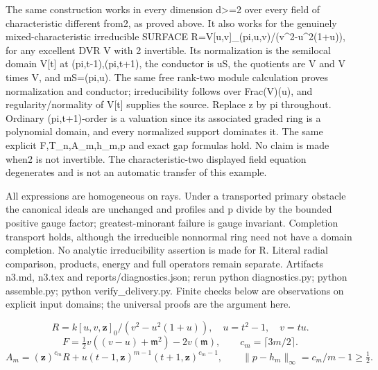 The same construction works in every dimension d\textgreater{}=2 over every field of characteristic different from2, as proved above. It also works for the genuinely mixed-characteristic irreducible SURFACE R=V[u,v]\_(pi,u,v)/(v\textasciicircum{}2-u\textasciicircum{}2(1+u)), for any excellent DVR V with 2 invertible. Its normalization is the semilocal domain V[t] at (pi,t-1),(pi,t+1), the conductor is uS, the quotients are V and V times V, and mS=(pi,u). The same free rank-two module calculation proves normalization and conductor; irreducibility follows over Frac(V)(u), and regularity/normality of V[t] supplies the source. Replace z by pi throughout. Ordinary (pi,t+1)-order is a valuation since its associated graded ring is a polynomial domain, and every normalized support dominates it. The same explicit F,T\_n,A\_m,h\_m,p and exact gap formulas hold. No claim is made when2 is not invertible. The characteristic-two displayed field equation degenerates and is not an automatic transfer of this example.

All expressions are homogeneous on rays. Under a transported primary obstacle the canonical ideals are unchanged and profiles and p divide by the bounded positive gauge factor; greatest-minorant failure is gauge invariant. Completion transport holds, although the irreducible nonnormal ring need not have a domain completion. No analytic irreducibility assertion is made for R. Literal radial comparison, products, energy and full operators remain separate. Artifacts n3.md, n3.tex and reports/diagnostics.json; rerun python diagnostics.py; python assemble.py; python verify\_delivery.py. Finite checks below are observations on explicit input domains; the universal proofs are the argument here.

\[
 R=k[u,v,\mathbf z]_0/(v^2-u^2(1+u)),\quad u=t^2-1,\quad v=tu.
\]
\[
 F=\tfrac12v((v-u)+\mathfrak m^2)-2v(\mathfrak m),\qquad
 c_m=\lceil3m/2\rceil.
\]
\[
 A_m=(\mathbf z)^{c_m}R+u(t-1,\mathbf z)^{m-1}(t+1,\mathbf z)^{c_m-1},
 \qquad\|p-h_m\|_\infty=c_m/m-1\ge\tfrac12.
\]

